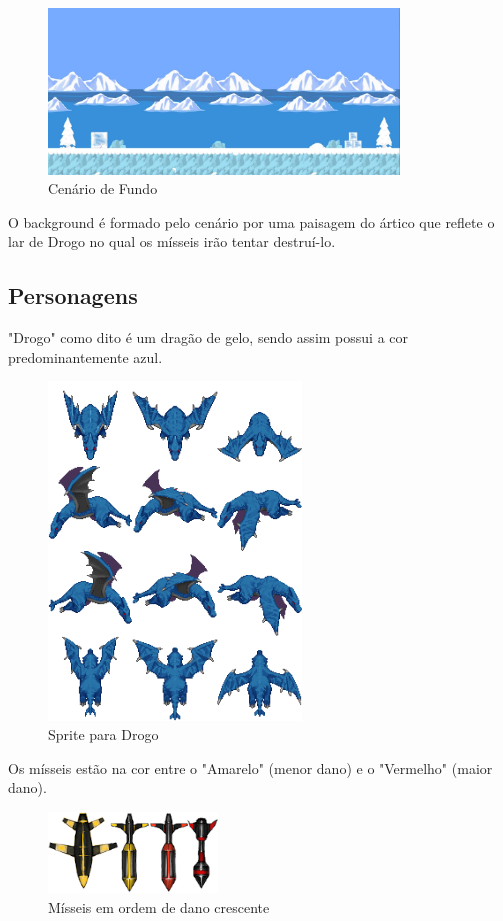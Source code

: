 \documentclass[a4paper,11pt]{article}
\begin{document}
\begin{figure}[!htb]
	\centering
	\includegraphics[width=0.83\textwidth]{imagens/pi-Fundo.png}
	\caption{Cenário de Fundo}
\end{figure}

O background é formado pelo cenário por uma paisagem do ártico que reflete o lar de Drogo no qual os mísseis irão tentar destruí-lo.

\subsection{Personagens}
"Drogo" como dito é um dragão de gelo, sendo assim possui a cor predominantemente azul.
\begin{figure}[!htb]
	\centering
	\includegraphics[width=0.6\textwidth]{imagens/pi-DragaoDef.png}
	\caption{Sprite para Drogo}
\end{figure}

Os mísseis estão na cor entre o "Amarelo" (menor dano) e o "Vermelho" (maior dano).
\begin{figure}[!htb]
	\centering
	\includegraphics[width=0.4\textwidth]{imagens/pi-Misseis.png}
	\caption{Mísseis em ordem de dano crescente}
\end{figure}
\end{document}
